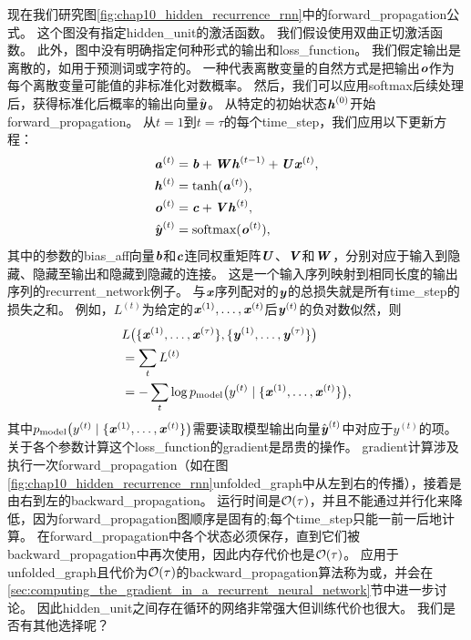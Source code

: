 
现在我们研究图\ref{fig:chap10_hidden_recurrence_rnn}中的\gls{forward_propagation}公式。
这个图没有指定\gls{hidden_unit}的激活函数。
我们假设使用双曲正切激活函数。
此外，图中没有明确指定何种形式的输出和\gls{loss_function}。
我们假定输出是离散的，如用于预测词或字符的。
一种代表离散变量的自然方式是把输出$\boldsymbol{\mathit{o}}$作为每个离散变量可能值的非标准化对数概率。
然后，我们可以应用\gls{softmax}后续处理后，获得标准化后概率的输出向量$\hat {\boldsymbol{\mathit{y}}}$。
从特定的初始状态$\boldsymbol{\mathit{h}}^{(0)}$开始\gls{forward_propagation}。
从$t= 1$到$t = \tau$的每个\gls{time_step}，我们应用以下更新方程：
\begin{align}
\label{eq:108a}
 \boldsymbol{\mathit{a}}^{(t)} &= \boldsymbol{\mathit{b}} + \boldsymbol{\mathit{W}} \boldsymbol{\mathit{h}}^{(t-1)} + \boldsymbol{\mathit{U}} \boldsymbol{\mathit{x}}^{(t)}, \\
  \boldsymbol{\mathit{h}}^{(t)} &= \tanh(\boldsymbol{\mathit{a}}^{(t)} ), \\
  \boldsymbol{\mathit{o}}^{(t)} &= \boldsymbol{\mathit{c}} + \boldsymbol{\mathit{V}} \boldsymbol{\mathit{h}}^{(t)}, \\
  \hat {\boldsymbol{\mathit{y}}}^{(t)} &= \text{softmax}(\boldsymbol{\mathit{o}}^{(t)}),
\end{align}
其中的参数的\gls{bias_aff}向量$\boldsymbol{\mathit{b}}$和$\boldsymbol{\mathit{c}}$连同权重矩阵$\boldsymbol{\mathit{U}}$、$\boldsymbol{\mathit{V}}$和$\boldsymbol{\mathit{W}}$，分别对应于输入到隐藏、隐藏至输出和隐藏到隐藏的连接。
这是一个输入序列映射到相同长度的输出序列的\gls{recurrent_network}例子。
与$\boldsymbol{\mathit{x}}$序列配对的$\boldsymbol{\mathit{y}}$的总损失就是所有\gls{time_step}的损失之和。
例如，$L^{(t)}$为给定的$\boldsymbol{\mathit{x}}^{(1)}, \dots, \boldsymbol{\mathit{x}}^{(t)}$后$\boldsymbol{\mathit{y}}^{(t)}$的负对数似然，则
\begin{align} \label{eq:1012L}
 & L\big( \{ \boldsymbol{\mathit{x}}^{(1)}, \dots, \boldsymbol{\mathit{x}}^{(\tau)} \}, \{ \boldsymbol{\mathit{y}}^{(1)}, \dots, \boldsymbol{\mathit{y}}^{(\tau)}  \} \big) \\
 & = \sum_t L^{(t)} \\
 & = - \sum_t \log p_{\text{model}} \big(  y^{(t)} \mid  \{ \boldsymbol{\mathit{x}}^{(1)}, \dots, \boldsymbol{\mathit{x}}^{(t)} \} \big) ,
\end{align}
其中$p_{\text{model}} \big(  y^{(t)} \mid  \{ \boldsymbol{\mathit{x}}^{(1)}, \dots, \boldsymbol{\mathit{x}}^{(t)} \} \big) $需要读取模型输出向量$\hat {\boldsymbol{\mathit{y}}}^{(t)}$中对应于$y^{(t)}$的项。
关于各个参数计算这个\gls{loss_function}的\gls{gradient}是昂贵的操作。
\gls{gradient}计算涉及执行一次\gls{forward_propagation}（如在图\ref{fig:chap10_hidden_recurrence_rnn}\gls{unfolded_graph}中从左到右的传播），接着是由右到左的\gls{backward_propagation}。
运行时间是$\mathcal{O}(\tau)$，并且不能通过并行化来降低，因为\gls{forward_propagation}图顺序是固有的;每个\gls{time_step}只能一前一后地计算。
在\gls{forward_propagation}中各个状态必须保存，直到它们被\gls{backward_propagation}中再次使用，因此内存代价也是$\mathcal{O}(\tau)$。
应用于\gls{unfolded_graph}且代价为$\mathcal{O}(\tau)$的\gls{backward_propagation}算法称为或，并会在\ref{sec:computing_the_gradient_in_a_recurrent_neural_network}节中进一步讨论。
因此\gls{hidden_unit}之间存在循环的网络非常强大但训练代价也很大。
我们是否有其他选择呢？

